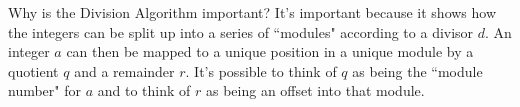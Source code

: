 \documentclass[letterpaper]{article}
\theoremstyle{definition}
\theoremstyle{case}
\begin{document}
Why is the Division Algorithm important?  It's important because it shows how
the integers can be split up into a series of ``modules" according to a divisor
$d$.  An integer $a$ can then be mapped to a unique position in a unique module
by a quotient $q$ and a remainder $r$.  It's possible to think of $q$ as being
the ``module number" for $a$ and to think of $r$ as being an offset into that
module.
\end{document}
